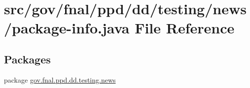 \hypertarget{gov_2fnal_2ppd_2dd_2testing_2news_2package-info_8java}{\section{src/gov/fnal/ppd/dd/testing/news/package-\/info.java File Reference}
\label{gov_2fnal_2ppd_2dd_2testing_2news_2package-info_8java}
}
\subsection*{Packages}
\begin{DoxyCompactItemize}
\item 
package \hyperlink{namespacegov_1_1fnal_1_1ppd_1_1dd_1_1testing_1_1news}{gov.\-fnal.\-ppd.\-dd.\-testing.\-news}
\end{DoxyCompactItemize}
